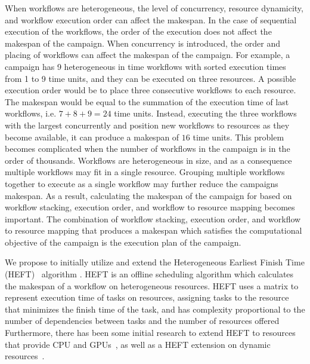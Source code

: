 When workflows are heterogeneous, the level of concurrency, resource dynamicity, and workflow execution order can affect the makespan.
In the case of sequential execution of the workflows, the order of the execution does not affect the makespan of the campaign.
When concurrency is introduced, the order and placing of workflows can affect the makespan of the campaign.
For example, a campaign has 9 heterogeneous in time workflows with sorted execution times from 1 to 9 time units, and they can be executed on three resources.
A possible execution order would be to place three consecutive workflows to each resource.
The makespan would be equal to the summation of the execution time of last workflows, i.e. $7 + 8 + 9 = 24$ time units.
Instead, executing the three workflows with the largest concurrently and position new workflows to resources as they become available, it can produce a makespan of $16$ time units.
This problem becomes complicated when the number of workflows in the campaign is in the order of thousands.
Workflows are heterogeneous in size, and as a consequence multiple workflows may fit in a single resource.
Grouping multiple workflows together to execute as a single workflow may further reduce the campaigns makespan.
As a result, calculating the makespan of the campaign for based on workflow stacking, execution order, and workflow to resource mapping becomes important.
The combination of workflow stacking, execution order, and workflow to resource mapping that produces a makespan which satisfies the computational objective of the campaign is the execution plan of the campaign.

We propose to initially utilize and extend the Heterogeneous Earliest Finish Time (HEFT)~\cite{topcuoglu2002performance} algorithm .
HEFT is an offline scheduling algorithm which calculates the makespan of a workflow on heterogeneous resources.
HEFT uses a matrix to represent execution time of tasks on resources, assigning tasks to the resource that minimizes the finish time of the task, and has complexity proportional to the number of dependencies between tasks and the number of resources offered 
Furthermore, there has been some initial research to extend HEFT to resources that provide CPU and GPUs~\cite{shetti2013optimization}, as well as a HEFT extension on dynamic resources~\cite{dong2007pfas}.

